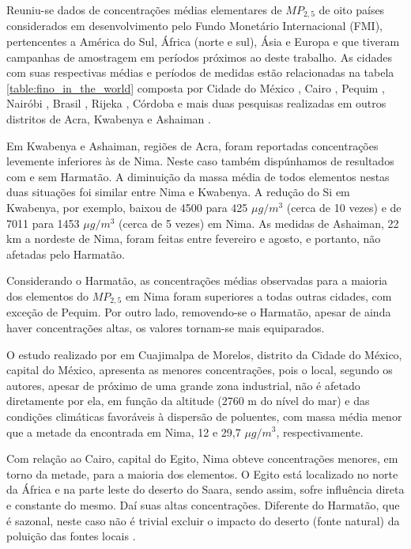 Reuniu-se dados de concentrações médias elementares de $MP_{2,5}$ de oito 
países considerados em desenvolvimento pelo Fundo Monetário Internacional (FMI),
pertencentes a América do Sul, África (norte e sul), Ásia e Europa e que tiveram
campanhas de amostragem em períodos próximos ao deste trabalho. As cidades
com suas respectivas médias e períodos de medidas estão relacionadas na 
tabela \ref{table:fino_in_the_world} composta por  
Cidade do México \citep{diaz2014},
Cairo  \citep{boman2013},
Pequim  \citep{yang2011},
Nairóbi   \citep{gaita2014},
Brasil \citep{andrade2012urban},
Rijeka  \citep{ivovsevic2015}, 
Córdoba  \citep{achad2014} e mais duas pesquisas realizadas em 
outros distritos de Acra, Kwabenya \citep{aboh2009} e Ashaiman \citep{ofosu2012}. 

Em Kwabenya e Ashaiman, regiões de Acra, foram reportadas concentrações 
levemente inferiores às de Nima. Neste caso também dispúnhamos de resultados 
com e sem Harmatão. A diminuição da massa média de todos elementos nestas duas 
situações foi similar entre Nima e Kwabenya. A redução do Si em Kwabenya, 
por exemplo, baixou de 4500 para 425 $\mu g/m^3$ 
(cerca de 10 vezes) e de 7011 para 1453 $\mu g/m^3$ (cerca de 5 vezes) em Nima. 
As medidas de Ashaiman, 22 km a nordeste de Nima, foram feitas entre 
fevereiro e agosto, e portanto, não afetadas pelo Harmatão.

Considerando o Harmatão, as concentrações médias observadas para a maioria dos 
elementos do $MP_{2,5}$ em Nima foram superiores a todas outras cidades, com 
exceção de Pequim. Por outro lado, removendo-se o Harmatão, apesar de ainda 
haver concentrações altas, os valores tornam-se mais equiparados. 

O estudo realizado por \citet{diaz2014} em Cuajimalpa de Morelos, distrito 
da Cidade do México, capital do México, apresenta as menores concentrações, 
pois o local, segundo os autores, apesar de próximo de uma grande zona industrial, 
não é afetado diretamente por ela, em função da altitude (2760 m do nível do mar)
e das condições climáticas favoráveis à dispersão de poluentes, com massa média 
menor que a metade da encontrada em Nima, 12 e 29,7 $\mu g/m^3$, respectivamente.

Com relação ao Cairo, capital do Egito, Nima obteve concentrações menores, 
em torno da metade, para a maioria dos elementos. O Egito está localizado 
no norte da África e na parte leste do deserto do Saara, sendo assim,
sofre influência direta e constante do mesmo. Daí suas altas concentrações. 
Diferente do Harmatão, que é sazonal, neste caso não é trivial excluir o impacto 
do deserto (fonte natural) da poluição das fontes locais \citet{boman2013}.

